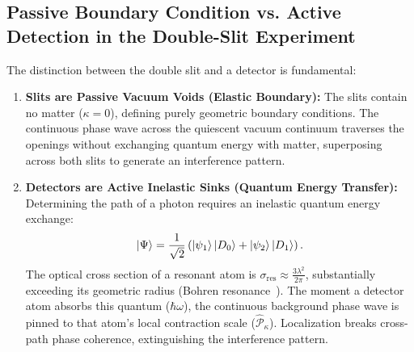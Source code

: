 \documentclass[11pt,a4paper]{article}
\begin{document}
\subsection{Passive Boundary Condition vs. Active Detection in the Double-Slit Experiment}
The distinction between the double slit and a detector is fundamental:
\begin{enumerate}
    \item \textbf{Slits are Passive Vacuum Voids (Elastic Boundary):} The slits contain no matter ($\kappa = 0$), defining purely geometric boundary conditions. The continuous phase wave across the quiescent vacuum continuum traverses the openings without exchanging quantum energy with matter, superposing across both slits to generate an interference pattern.
    \item \textbf{Detectors are Active Inelastic Sinks (Quantum Energy Transfer):} Determining the path of a photon requires an inelastic quantum energy exchange:
          \begin{equation}
              \ket{\Psi} = \frac{1}{\sqrt{2}} \left( \ket{\psi_1}\ket{D_0} + \ket{\psi_2}\ket{D_1} \right).
              \label{eq:dolanik_olcum_em}
          \end{equation}
          The optical cross section of a resonant atom is $\sigma_{\mathrm{res}} \approx \frac{3\lambda^2}{2\pi}$, substantially exceeding its geometric radius (Bohren resonance~\cite{bohren1983,paul1982}). The moment a detector atom absorbs this quantum ($\hbar\omega$), the continuous background phase wave is pinned to that atom's local contraction scale ($\hat{\mathcal{P}}_\kappa$). Localization breaks cross-path phase coherence, extinguishing the interference pattern.
\end{enumerate}
\end{document}
